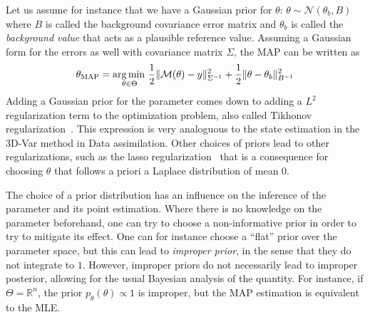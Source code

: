 \documentclass[../../Main_ManuscritThese.tex]{subfiles}
\begin{document}
Let us assume for instance that we have a Gaussian prior for $\theta$: $\theta \sim \mathcal{N}(\theta_{b},B)$ where $B$ is called the background covariance error matrix and $\theta_b$ is called the \emph{background value} that acts as a plausible reference value. Assuming a Gaussian form for the errors as well with covariance matrix $\Sigma$, the MAP can be written as
\begin{equation}
  {\theta}_{\mathrm{MAP}} = \operatorname*{arg\,min \,}_{\theta \in \Theta} \frac{1}{2}\| \mathcal{M}(\theta) - y\|^2_{\Sigma^{-1}} + \frac{1}{2}\|\theta - \theta_b\|^2_{B^{-1}}
\end{equation}
Adding a Gaussian prior for the parameter comes down to adding a $L^2$ regularization term to the optimization problem, also called Tikhonov regularization~\cite{tikhonov_solutions_1977}. This expression is very analoguous to the state estimation in the 3D-Var method in Data assimilation. 
Other choices of priors lead to other regularizations, such as the lasso regularization~\cite{tibshirani_regression_2011} that is a consequence for choosing $\theta$ that follows a priori a Laplace distribution of mean $0$.

The choice of a prior distribution has an influence on the inference of the parameter and its point estimation. Where there is no knowledge on the parameter beforehand, one can try to choose a non-informative prior in order to try to mitigate its effect. One can for instance choose a ``flat'' prior over the parameter space, but this can lead to \emph{improper prior}, in the sense that they do not integrate to $1$. However, improper priors do not necessarily lead to improper posterior, allowing for the usual Bayesian analysis of the quantity. For instance, if $\Theta=\mathbb{R}^n$, the prior $p_{\theta}(\theta) \propto 1$ is improper, but the MAP estimation is equivalent to the MLE.

\end{document}
